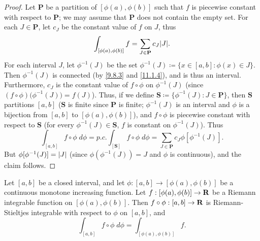 \begin{proof}
  Let \(\mathbf{P}\) be a partition of \([\phi(a), \phi(b)]\) such that \(f\) is piecewise constant with respect to \(\mathbf{P}\);
  we may assume that \(\mathbf{P}\) does not contain the empty set.
  For each \(J \in \mathbf{P}\), let \(c_J\) be the constant value of \(f\) on \(J\), thus
  \[
    \int_{[\phi(a), \phi(b)]} f = \sum_{J \in \mathbf{P}} c_J \abs{J}.
  \]
  For each interval \(J\), let \(\phi^{-1}(J)\) be the set \(\phi^{-1}(J) \coloneqq \{x \in [a, b] : \phi(x) \in J\}\).
  Then \(\phi^{-1}(J)\) is connected (by \cref{9.8.3} and \cref{11.1.4}), and is thus an interval.
  Furthermore, \(c_J\) is the constant value of \(f \circ \phi\) on \(\phi^{-1}(J)\) (since \((f \circ \phi)\big(\phi^{-1}(J)\big) = f(J)\)).
  Thus, if we define \(\mathbf{S} \coloneqq \{\phi^{-1} (J) : J \in \mathbf{P}\}\), then \(\mathbf{S}\) partitions \([a, b]\)
  (\(\mathbf{S}\) is finite since \(\mathbf{P}\) is finite;
  \(\phi^{-1}(J)\) is an interval and \(\phi\) is a bijection from \([a, b]\) to \([\phi(a), \phi(b)]\)),
  and \(f \circ \phi\) is piecewise constant with respect to \(\mathbf{S}\) (for every \(\phi^{-1}(J) \in \mathbf{S}\), \(f\) is constant on \(\phi^{-1}(J)\)).
  Thus
  \[
    \int_{[a, b]} f \circ \phi \; d \phi = p.c. \int_{[\mathbf{S}]} f \circ \phi \; d \phi = \sum_{J \in \mathbf{P}} c_J \phi[\phi^{-1}(J)].
  \]
  But \(\phi[\phi^{-1}(J)] = \left\lvert J\right\rvert\) (since \(\phi(\phi^{-1}(J)) = J\) and \(\phi\) is continuous), and the claim follows.
\end{proof}

\begin{proposition}\label{11.10.6}
  Let \([a, b]\) be a closed interval, and let \(\phi : [a, b] \to [\phi(a), \phi(b)]\) be a continuous monotone increasing function.
  Let \(f : [\phi(a), \phi(b)] \to \mathbf{R}\) be a Riemann integrable function on \([\phi(a), \phi(b)]\).
  Then \(f \circ \phi : [a, b] \to \mathbf{R}\) is Riemann-Stieltjes integrable with respect to \(\phi\) on \([a, b]\), and
  \[
    \int_{[a, b]} f \circ \phi \; d \phi = \int_{[\phi(a), \phi(b)]} f.
  \]
\end{proposition}

